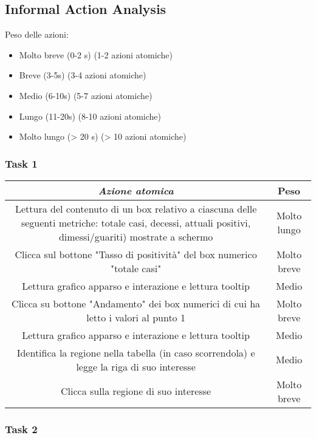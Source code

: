 \subsection{Informal Action Analysis}
\label{ss:informal-action-analysis}
Peso delle azioni:
\begin{itemize}
    \item Molto breve (0-2 s) (1-2 azioni atomiche)
    \item Breve (3-5s) (3-4 azioni atomiche)
    \item Medio (6-10s) (5-7 azioni atomiche)
    \item Lungo (11-20s) (8-10 azioni atomiche)
    \item Molto lungo (> 20 s) (> 10 azioni atomiche)
\end{itemize}

\subsubsection{Task 1}
\label{sss:iaa-task-1}
{
\renewcommand{\arraystretch}{2}
\begin{longtable}[h]{| c | c |}
    \hline
    \textit{Azione atomica} & \textbf{Peso} \\
    \hline
    \endhead
    Lettura del contenuto di un box relativo a ciascuna delle seguenti metriche: totale casi, decessi, attuali positivi, dimessi/guariti) mostrate a schermo & Molto lungo \\
    \hline
    Clicca sul bottone "Tasso di positività" del box numerico "totale casi" & Molto breve  \\
    \hline
    Lettura grafico apparso e interazione e lettura tooltip & Medio \\
    \hline
    Clicca su bottone "Andamento" dei box numerici di cui ha letto i valori al punto 1 & Molto breve \\
    \hline
    Lettura grafico apparso e interazione e lettura tooltip & Medio \\
    \hline
    Identifica la regione nella tabella (in caso scorrendola) e legge la riga di suo interesse & Medio \\
    \hline
    Clicca sulla regione di suo interesse & Molto breve \\
    \hline
\end{longtable}
}

\subsubsection{Task 2}
\label{sss:iaa-task-2}

